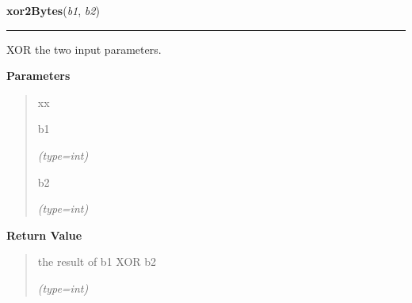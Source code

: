 \hspace{.8\funcindent}\begin{boxedminipage}{\funcwidth}

    \raggedright \textbf{xor2Bytes}(\textit{b1}, \textit{b2})

    \vspace{-1.5ex}

    \rule{\textwidth}{0.5\fboxrule}
\setlength{\parskip}{2ex}
    XOR the two input parameters.

\setlength{\parskip}{1ex}
      \textbf{Parameters}
      \vspace{-1ex}

      \begin{quote}
        \begin{Ventry}{xx}

          \item[b1]

            {\it (type=int)}

          \item[b2]

            {\it (type=int)}

        \end{Ventry}

      \end{quote}

      \textbf{Return Value}
    \vspace{-1ex}

      \begin{quote}
      the result of b1 XOR b2

      {\it (type=int)}

      \end{quote}

    \end{boxedminipage}

    \label{helpers:xor}

    \vspace{0.5ex}

